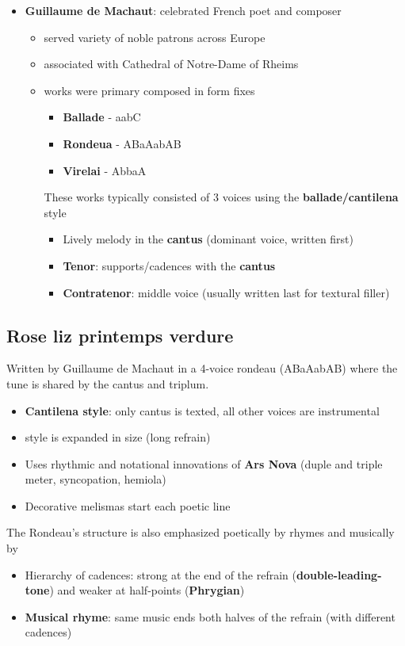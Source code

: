 \documentclass{article}
\begin{document}
\begin{itemize}
\begin{itemize}
\begin{itemize}
          \end{itemize}
      \end{itemize}
    \item \textbf{Guillaume de Machaut}: celebrated French poet and composer
      \begin{itemize}
        \item served variety of noble patrons across Europe
        \item associated with Cathedral of Notre-Dame of Rheims
        \item works were primary composed in form fixes
          \begin{itemize}
            \item \textbf{Ballade} - aabC
            \item \textbf{Rondeua} - ABaAabAB
            \item \textbf{Virelai} - AbbaA
          \end{itemize}
          These works typically consisted of 3 voices using the \textbf{ballade/cantilena} style
          \begin{itemize}
            \item Lively melody in the \textbf{cantus} (dominant voice, written first)
            \item \textbf{Tenor}: supports/cadences with the \textbf{cantus}
            \item \textbf{Contratenor}: middle voice (usually written last for textural filler)
          \end{itemize}
      \end{itemize}
  \end{itemize}
  \subsection{Rose liz printemps verdure}
  Written by Guillaume de Machaut in a 4-voice rondeau (ABaAabAB) where the tune is shared by the cantus and triplum.
  \begin{itemize}
    \item \textbf{Cantilena style}: only cantus is texted, all other voices are instrumental
    \item style is expanded in size (long refrain)
    \item Uses rhythmic and notational innovations of \textbf{Ars Nova} (duple and triple meter, syncopation, hemiola)
    \item Decorative melismas start each poetic line
  \end{itemize}
  The Rondeau's structure is also emphasized poetically by rhymes and musically by
  \begin{itemize}
    \item Hierarchy of cadences: strong at the end of the refrain (\textbf{double-leading-tone}) and weaker at half-points (\textbf{Phrygian})
    \item \textbf{Musical rhyme}: same music ends both halves of the refrain (with different cadences)
  \end{itemize}
\end{document}
